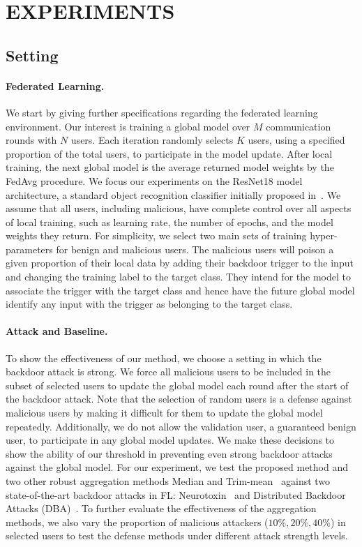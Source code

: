 \documentclass{article} %
\begin{document}
\section{EXPERIMENTS}

\subsection{Setting}

\vspace{-10pt}
\paragraph{Federated Learning.} We start by giving further specifications regarding the federated learning environment. Our interest is training a global model over $M$ communication rounds with $N$ users. Each iteration randomly selects $K$ users, using a specified proportion of the total users, to participate in the model update. After local training, the next global model is the average returned model weights by the FedAvg procedure. We focus  our experiments on the ResNet18 model architecture, a standard object recognition classifier initially proposed in~\cite{resnet}. We assume that all users, including malicious, have complete control over all aspects of local training, such as learning rate, the number of epochs, and the model weights they return. For simplicity, we select two main sets of training hyper-parameters for benign and malicious users. The malicious users will poison a given proportion of their local data by adding their backdoor trigger to the input and changing the training label to the target class. They intend for the model to associate the trigger with the target class and hence have the future global model identify any input with the trigger as belonging to the target class. 

\vspace{-10pt}
\paragraph{Attack and Baseline.} To show the effectiveness of our method, we choose a setting in which the backdoor attack is strong. We force all malicious users to be included in the subset of selected users to update the global model each round after the start of the backdoor attack. Note that the selection of random users is a defense against malicious users by making it difficult for them to update the global model repeatedly. Additionally, we do not allow the validation user, a guaranteed benign user, to participate in any global model updates. We make these decisions to show the ability of our threshold in preventing even strong backdoor attacks against the global model. 
For our experiment, we test the proposed method and two other robust aggregation methods Median and Trim-mean~\citep{trim-mean} against two state-of-the-art backdoor attacks in FL: Neurotoxin~\citep{neurotoxin} and Distributed Backdoor Attacks (DBA)~\citep{dba}. To further evaluate the effectiveness of the aggregation methods, we also vary the proportion of malicious attackers ($10\%, 20\%, 40\%$) in selected users to test the defense methods under different attack strength levels.
\end{document}
